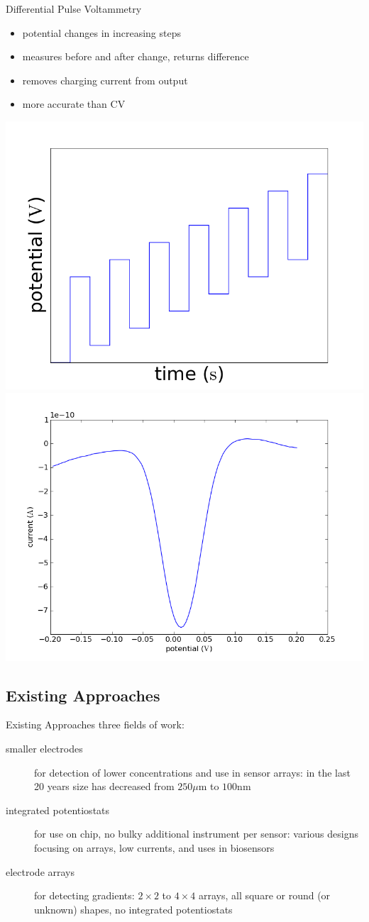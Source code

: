 \documentclass[10pt]{beamer}
\begin{document}
\begin{frame}{Differential Pulse Voltammetry}
	\begin{itemize}
		\item potential changes in increasing steps
		\item measures before and after change, returns difference
		\item removes charging current from output
		\item more accurate than CV
	\end{itemize}
	\includegraphics[width=0.5\linewidth]{figures/dpv.png}
	\includegraphics[width=0.5\linewidth]{figures/256.png}
\end{frame}

\subsection{Existing Approaches}
\begin{frame}{Existing Approaches}
	three fields of work:
	\begin{description}
		\item[smaller electrodes] for detection of lower concentrations and use in sensor arrays: in the last 20 years size has decreased from $250 \mu \mathrm{m}$ to $100 \mathrm{nm}$ \cite{shibuki1990emd, zhang2002nmn, bedioui1996cmm, zhang2002nse, kim2003img, wang2005mcn}
		\item[integrated potentiostats] for use on chip, no bulky additional instrument per sensor: various designs focusing on arrays, low currents, and uses in biosensors \cite{frey2003dip, murari2005ipn, stanacevic2007vpa, steffan2007scp}
		\item[electrode arrays] for detecting gradients: $2 \times 2$ to $4 \times 4$ arrays, all square or round (or unknown) shapes, no integrated potentiostats \cite{george2001fsp, naware2003dam, hafez2005eif, zhang2005eam}
	\end{description}
\end{frame}
\end{document}

